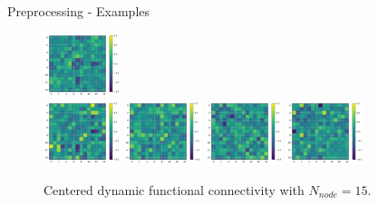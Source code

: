 \documentclass{beamer}
\begin{document}
\begin{frame}{Preprocessing - Examples}
\begin{figure}[H]
        \includegraphics[width=0.2\textwidth]{../Analysis/DFC/size=480_step=180_rho=0.1/node=15_id=100206/c_14.jpg} \\
        \includegraphics[width=0.2\textwidth]{../Analysis/DFC/size=480_step=180_rho=0.1/node=15_id=100206/c_16.jpg}
        \includegraphics[width=0.2\textwidth]{../Analysis/DFC/size=480_step=180_rho=0.1/node=15_id=100206/c_18.jpg}
        \includegraphics[width=0.2\textwidth]{../Analysis/DFC/size=480_step=180_rho=0.1/node=15_id=100206/c_20.jpg}
        \includegraphics[width=0.2\textwidth]{../Analysis/DFC/size=480_step=180_rho=0.1/node=15_id=100206/c_22.jpg} \\
        \caption{Centered dynamic functional connectivity with $N_{node} = 15$.}
    \end{figure}

\end{frame}
\end{document}
